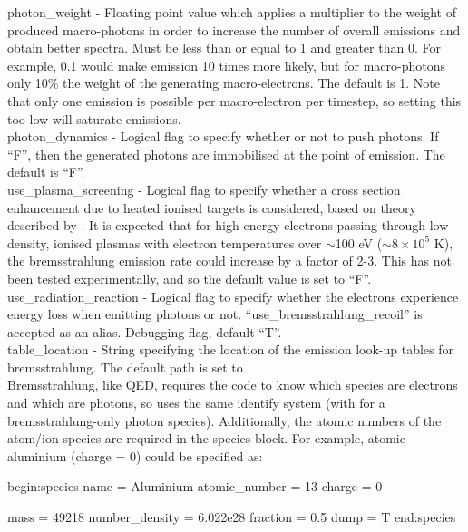 {\emphtext photon\_weight} - Floating point value which applies a multiplier to
  the weight of produced macro-photons in order to increase the number
  of overall emissions and obtain better spectra. Must be less than or equal
  to 1 and greater than 0. For example, 0.1 would make emission 10 times more
  likely, but for macro-photons only 10\% the weight of the generating
  macro-electrons. The default is 1. Note that only one emission is possible
  per macro-electron per timestep, so setting this too low will saturate
  emissions.\\

{\emphtext photon\_dynamics} - Logical flag to specify whether or not to push
  photons. If ``F'', then the generated photons are immobilised at the point of
  emission. The default is ``F''.\\

{\emphtext use\_plasma\_screening} - Logical flag to specify whether a cross
  section enhancement due to heated ionised targets is considered, based on
  theory described by \citet{Wu2018}. It is expected that for high energy
  electrons passing through low density, ionised plasmas with electron
  temperatures over $\sim$100 eV ($\sim8\times 10^{5}$ K), the bremsstrahlung
  emission rate could increase by a factor of 2-3. This has not been tested
  experimentally, and so the default value is set to ``F''.\\

{\emphtext use\_radiation\_reaction} - Logical flag to specify whether the
  electrons experience energy loss when emitting photons or not.
  ``use\_bremsstrahlung\_recoil'' is accepted as an alias. Debugging
  flag, default ``T''.\\

{\emphtext table\_location} - String specifying the
  location of the emission look-up tables for bremsstrahlung.
  The default path is set to
  .\\

Bremsstrahlung, like QED, requires the code to know which species are electrons
and which are photons, so uses the same identify system (with
 for a bremsstrahlung-only photon species).
Additionally, the atomic numbers of the atom/ion species are required in
the species block. For example, atomic aluminium (charge = 0) could be
specified as:

\begin{boxverbatim}
begin:species
   name = Aluminium
   atomic_number = 13
   charge = 0

   mass = 49218
   number_density = 6.022e28
   fraction = 0.5
   dump = T
end:species
\end{boxverbatim}


